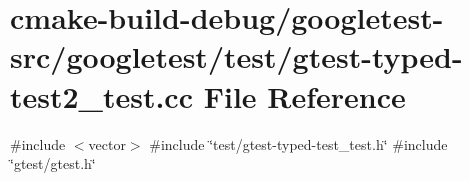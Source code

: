 \hypertarget{gtest-typed-test2__test_8cc}{}\section{cmake-\/build-\/debug/googletest-\/src/googletest/test/gtest-\/typed-\/test2\+\_\+test.cc File Reference}
\label{gtest-typed-test2__test_8cc}
{\ttfamily \#include $<$vector$>$}\newline
{\ttfamily \#include \char`\"{}test/gtest-\/typed-\/test\+\_\+test.\+h\char`\"{}}\newline
{\ttfamily \#include \char`\"{}gtest/gtest.\+h\char`\"{}}\newline
